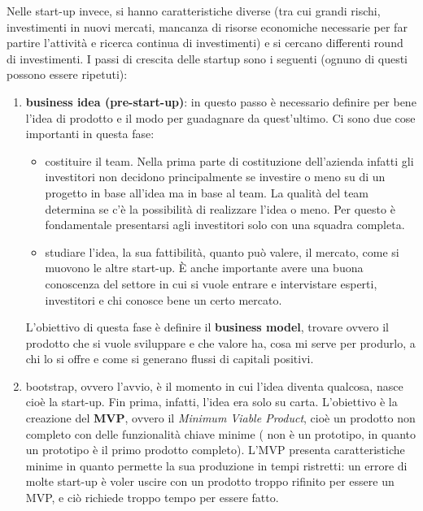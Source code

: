 Nelle start-up invece, si hanno caratteristiche diverse (tra cui grandi rischi,
investimenti in nuovi mercati, mancanza di risorse economiche necessarie per
far partire l'attività e ricerca continua di investimenti) e si cercano
differenti round di investimenti. I passi di crescita delle startup sono i
seguenti (ognuno di questi possono essere ripetuti):
\begin{enumerate}
 \item \textbf{business idea (pre-start-up)}: in questo passo è necessario
 definire per bene l'idea di prodotto e il modo per guadagnare da quest'ultimo.
 Ci sono due cose importanti in questa fase:
 \begin{itemize}
  \item costituire il team. Nella prima parte di costituzione dell'azienda
  infatti gli investitori non decidono principalmente se investire o meno su di
  un progetto in base all'idea ma in base al team. La qualità del team
  determina se c'è la possibilità di realizzare l'idea o meno. Per questo è
  fondamentale presentarsi agli investitori solo con una squadra completa.

  \item studiare l'idea, la sua fattibilità, quanto può valere, il mercato,
  come si muovono le altre start-up. È anche importante avere una buona
  conoscenza del settore in cui si vuole entrare e intervistare esperti,
  investitori e chi conosce bene un certo mercato. 
 \end{itemize}
 L'obiettivo di questa fase è definire il \textbf{business model}, trovare
 ovvero il prodotto che si vuole sviluppare e che valore ha, cosa mi serve per
 produrlo, a chi lo si offre e come si generano flussi di capitali positivi.
 
 \item bootstrap, ovvero l'avvio, è il momento in cui l'idea diventa qualcosa,
 nasce cioè la start-up. Fin prima, infatti, l'idea era solo su carta.
 L'obiettivo è la creazione del \textbf{MVP}, ovvero il \textit{Minimum Viable
 Product}, cioè un prodotto non completo con delle funzionalità chiave minime (
 non è un prototipo, in quanto un prototipo è il primo prodotto completo).
 L'MVP presenta caratteristiche minime in quanto permette la sua produzione in
 tempi ristretti: un errore di molte start-up è voler uscire con un prodotto
 troppo rifinito per essere un MVP, e ciò richiede troppo tempo per essere
 fatto.
 

\end{enumerate}
